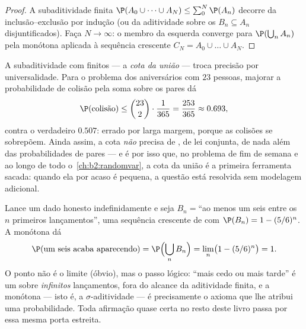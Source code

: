 \begin{proof}
A subaditividade finita $\P(A_0 \cup \dots \cup A_N) \leq
\sum_0^N \P(A_n)$ decorre da inclusão--exclusão por indução
(ou da aditividade sobre os $B_n \subseteq A_n$ disjuntificados).
Faça $N \to \infty$: o membro da esquerda converge para
$\P(\bigcup_n A_n)$ pela  monótona aplicada à
sequência crescente $C_N = A_0 \cup \dots \cup A_N$.
\end{proof}

\begin{example}\label{ex:b2:proba:unionbound}
A subaditividade com finitos  --- a \emph{cota da
união} --- troca precisão por universalidade. Para o
problema dos aniversários com $23$ pessoas, majorar a probabilidade
de colisão pela soma sobre os pares dá
\[
\P(\text{colisão}) \leq \binom{23}2\cdot\frac1{365}
= \frac{253}{365} \approx 0.693 ,
\]
contra o verdadeiro $0.507$: errado por larga margem, porque as
colisões se sobrepõem. Ainda assim, a cota \emph{não} precisa de
, de lei conjunta, de nada além das
probabilidades de pares --- e é por isso que, no problema de fim de semana e
ao longo de todo o~\cref{ch:b2:randomvar}, a cota da união é a
primeira ferramenta sacada: quando ela por acaso é pequena, a questão está
resolvida sem modelagem adicional.
\end{example}

\begin{example}\label{ex:b2:proba:sixeventually}
Lance um dado honesto indefinidamente e seja $B_n = {}$``ao menos um seis
entre os $n$ primeiros lançamentos'', uma sequência crescente de 
com $\P(B_n) = 1 - (5/6)^n$. A  monótona dá
\[
\P(\text{um seis acaba aparecendo})
= \P\Bigl(\bigcup_nB_n\Bigr)
= \lim_n\bigl(1 - (5/6)^n\bigr) = 1 .
\]
O ponto não é o limite (óbvio), mas o passo lógico:
``mais cedo ou mais tarde'' é um  sobre \emph{infinitos}
lançamentos, fora do alcance da aditividade finita, e a 
monótona --- isto é, a $\sigma$-aditividade --- é precisamente
o axioma que lhe atribui uma probabilidade. Toda afirmação quase
certa no resto deste livro passa por essa mesma
porta estreita.
\end{example}

